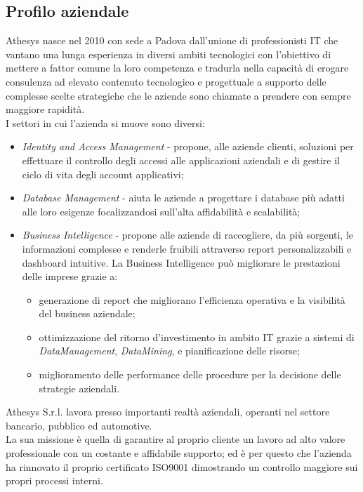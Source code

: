 \subsection{Profilo aziendale}
Athesys nasce nel 2010 con sede a Padova dall'unione di professionisti IT che vantano una lunga esperienza in diversi ambiti tecnologici con l’obiettivo di mettere a fattor comune la loro competenza e tradurla nella capacità di erogare consulenza ad elevato contenuto tecnologico e progettuale a supporto delle complesse scelte strategiche che le aziende sono chiamate a prendere con sempre maggiore rapidità\cite{athesys}.\\
I settori in cui l'azienda si muove sono diversi:
\begin{itemize}
	\item \textit{Identity and Access Management} - propone, alle aziende clienti, soluzioni per effettuare il controllo degli accessi alle applicazioni aziendali e di gestire il ciclo di vita degli account applicativi;
	\item \textit{Database Management} - aiuta le aziende a progettare i database più adatti alle loro esigenze focalizzandosi sull'alta affidabilità e scalabilità;
	\item \textit{Business Intelligence} - propone alle aziende di raccogliere, da più sorgenti, le informazioni complesse e renderle fruibili attraverso report personalizzabili e dashboard intuitive. La Business Intelligence può migliorare le prestazioni delle imprese grazie a:
	\begin{itemize}
		\item generazione di report che migliorano l'efficienza operativa e la visibilità del business aziendale;
		\item ottimizzazione del ritorno d'investimento in ambito IT grazie a sistemi di \emph{\gls{DataManagement}}\glsfirstoccur, \emph{\gls{DataMining}}\glsfirstoccur, e pianificazione delle risorse;
		\item miglioramento delle performance delle procedure per la decisione delle strategie aziendali.
	\end{itemize} 
\end{itemize}
Athesys S.r.l. lavora presso importanti realtà aziendali, operanti nel settore bancario, pubblico ed automotive.\\
La sua missione è quella di garantire al proprio cliente un lavoro ad alto valore professionale con un costante e affidabile supporto; ed è per questo che l'azienda ha rinnovato il proprio certificato ISO9001 dimostrando un controllo maggiore sui propri processi interni.\\

